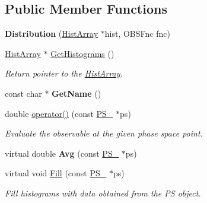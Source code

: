 \subsection*{Public Member Functions}
\begin{DoxyCompactItemize}
\item 
\hypertarget{classDistribution_aa7269a89c1c603c957891f49af7542e4}{}{\bfseries Distribution} (\hyperlink{classHistArray}{Hist\+Array} $\ast$hist, O\+B\+S\+Fnc fnc)\label{classDistribution_aa7269a89c1c603c957891f49af7542e4}

\item 
\hypertarget{classDistribution_a49dc0f91394f9adf82f8485ba9e12a6c}{}\hyperlink{classHistArray}{Hist\+Array} $\ast$ \hyperlink{classDistribution_a49dc0f91394f9adf82f8485ba9e12a6c}{Get\+Histograms} ()\label{classDistribution_a49dc0f91394f9adf82f8485ba9e12a6c}

\begin{DoxyCompactList}\small\item\em Return pointer to the \hyperlink{classHistArray}{Hist\+Array}. \end{DoxyCompactList}\item 
\hypertarget{classDistribution_ae5b5001def9ff1fadb0d9f34bcd3f2b4}{}const char $\ast$ {\bfseries Get\+Name} ()\label{classDistribution_ae5b5001def9ff1fadb0d9f34bcd3f2b4}

\item 
double \hyperlink{classDistribution_ab5f71f14986ae6fee369e1d3e288f793}{operator()} (const \hyperlink{classPS__2}{P\+S\+\_} $\ast$ps)
\begin{DoxyCompactList}\small\item\em Evaluate the observable at the given phase space point. \end{DoxyCompactList}\item 
\hypertarget{classDistribution_a2ccf70347a37bdb98f60067ee0ac4b87}{}virtual double {\bfseries Avg} (const \hyperlink{classPS__2}{P\+S\+\_} $\ast$ps)\label{classDistribution_a2ccf70347a37bdb98f60067ee0ac4b87}

\item 
virtual void \hyperlink{classDistribution_a3a1c16200b22ed7253b1b9f50145ebc9}{Fill} (const \hyperlink{classPS__2}{P\+S\+\_} $\ast$ps)
\begin{DoxyCompactList}\small\item\em Fill histograms with data obtained from the P\+S object. \end{DoxyCompactList}\end{DoxyCompactItemize}


